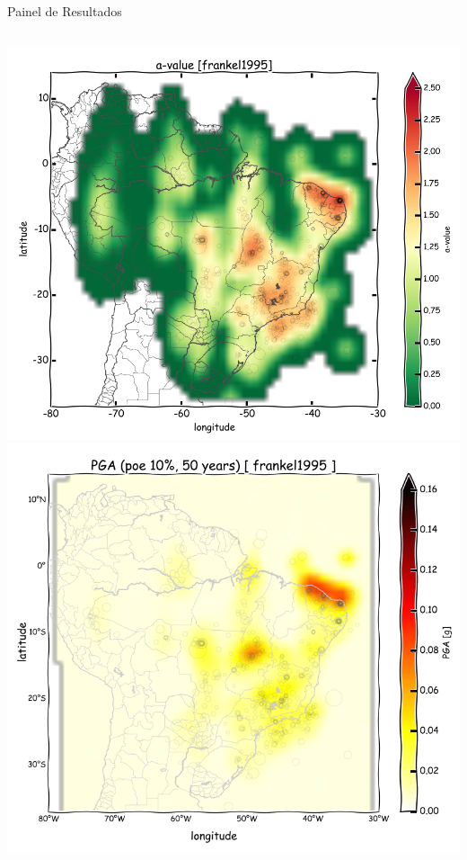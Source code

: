 \documentclass[ucs,8pt]{beamer}
\begin{document}
\begin{frame}{Painel de Resultados}
\begin{columns}
	\begin{column}[T]{.24\textwidth}
		\includegraphics[width=1\textwidth]{a_frankel_br} \\
		\includegraphics[width=1\textwidth]{pga_frankel}
	\end{column}
	

\end{columns}
\end{frame}
\end{document}
